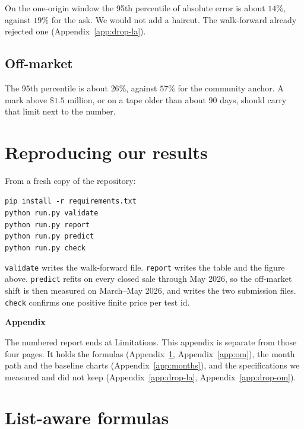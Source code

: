 \documentclass[11pt]{article}
\begin{document}
On the one-origin window the 95th percentile of absolute error is about \(14\%\), against \(19\%\) for the ask. We would not add a haircut. The walk-forward already rejected one (Appendix~\ref{app:drop-la}).

\subsection{Off-market}

The 95th percentile is about \(26\%\), against \(57\%\) for the community anchor. A mark above \(\$1.5\) million, or on a tape older than about 90 days, should carry that limit next to the number.


\section*{Reproducing our results}

From a fresh copy of the repository:

\texttt{pip install -r requirements.txt}\\
\texttt{python run.py validate}\\
\texttt{python run.py report}\\
\texttt{python run.py predict}\\
\texttt{python run.py check}

\texttt{validate} writes the walk-forward file. \texttt{report} writes the table and the figure above. \texttt{predict} refits on every closed sale through May 2026, so the off-market shift is then measured on March--May 2026, and writes the two submission files. \texttt{check} confirms one positive finite price per test id.

\newpage
\begin{center}
{\Large\bfseries Appendix}
\end{center}

\noindent The numbered report ends at Limitations. This appendix is separate from those four pages. It holds the formulas (Appendix~\ref{app:la}, Appendix~\ref{app:om}), the month path and the baseline charts (Appendix~\ref{app:months}), and the specifications we measured and did not keep (Appendix~\ref{app:drop-la}, Appendix~\ref{app:drop-om}).

\appendix
\makeatletter
\renewcommand{\@seccntformat}[1]{%
  \ifnum\pdfstrcmp{#1}{section}=0 Appendix \fi
  \csname the#1\endcsname\quad}
\makeatother
\section{List-aware formulas}
\label{app:la}
\end{document}
